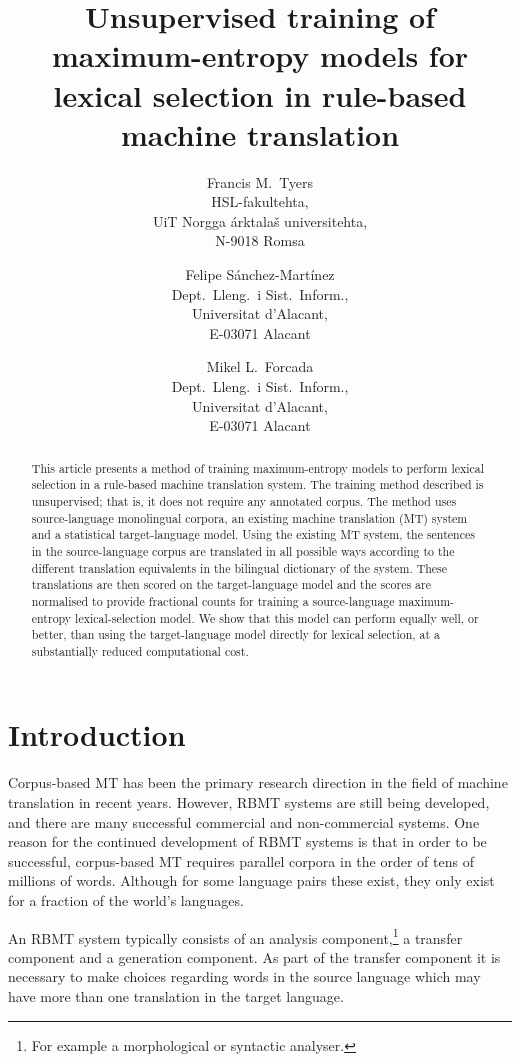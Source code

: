 \documentclass[11pt]{article}
\title{Unsupervised training of maximum-entropy models for lexical
    selection in rule-based machine translation}
\author{
 Francis M.\ Tyers \\
 HSL-fakultehta, \\
 UiT Norgga \'{a}rktala\v{s} universitehta, \\
 N-9018 Romsa \\
 \and
 Felipe S\'anchez-Mart\'inez \\
 Dept.\ Lleng.\ i Sist.\ Inform., \\
 Universitat d'Alacant,\\
 E-03071 Alacant\\
 \and
 Mikel L.\ Forcada \\
 Dept.\ Lleng.\ i Sist.\ Inform., \\
 Universitat d'Alacant,\\
 E-03071 Alacant\\
}
\date{}
\begin{document}
\maketitle

\begin{abstract}
  This article presents a method of training maximum-entropy models to
  perform lexical selection in a rule-based machine translation
  system. The training method described is unsupervised; that is, it
  does not require any annotated corpus. The method uses
  source-language monolingual corpora, an existing machine translation
  (MT) system and a statistical target-language model. Using the
  existing MT system, the sentences in the source-language corpus are
  translated in all possible ways according to the different
  translation equivalents in the bilingual dictionary of the system.
  These translations are then scored on the target-language model and
  the scores are normalised to provide fractional counts for training
  a source-language maximum-entropy lexical-selection model. We show
  that this model can perform equally well, or better, than using the
  target-language model directly for lexical selection, at a
  substantially reduced computational cost.
\end{abstract}


\section{Introduction}

Corpus-based MT has been the primary research direction in the field 
of machine translation in recent years. However, RBMT systems are 
still being developed, and there are many successful commercial 
and non-commercial systems. One reason for the continued development
of RBMT systems is that in order to be successful, corpus-based MT requires parallel corpora in
the order of tens of millions of words. Although for some language
pairs these exist, they only exist for a fraction of the 
world's languages. 

An RBMT system typically consists of an analysis component,\footnote{For example
a morphological or syntactic analyser.} a transfer
component and a generation component. As part of the transfer component
it is necessary to make choices regarding words in the source language
which may have more than one translation in the target language.
\end{document}
